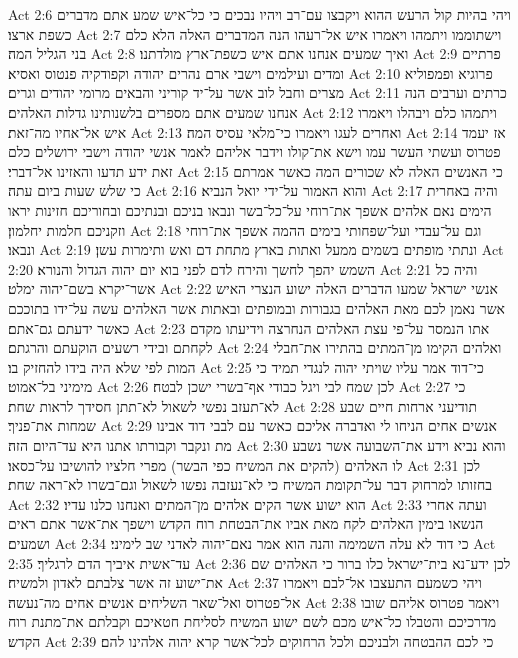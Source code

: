 Act 2:6  ויהי בהיות קול הרעש ההוא ויקבצו עם־רב ויהיו נבכים כי כל־איש שמע אתם מדברים כשפת ארצו׃
Act 2:7  וישתוממו ויתמהו ויאמרו איש אל־רעהו הנה המדברים האלה הלא כלם בני הגליל המה׃
Act 2:8  ואיך שמעים אנחנו אתם איש כשפת־ארץ מולדתנו׃
Act 2:9  פרתיים ומדים ועילמים וישבי ארם נהרים יהודה וקפודקיה פנטוס ואסיא׃
Act 2:10  פרוגיא ופמפוליא מצרים וחבל לוב אשר על־יד קוריני והבאים מרומי יהודים וגרים׃
Act 2:11  כרתים וערבים הנה אנחנו שמעים אתם מספרים בלשנותינו גדלות האלהים׃
Act 2:12  ויתמהו כלם ויבהלו ויאמרו איש אל־אחיו מה־זאת׃
Act 2:13  ואחרים לעגו ויאמרו כי־מלאי עסיס המה׃
Act 2:14  אז יעמד פטרוס ועשתי העשר עמו וישא את־קולו וידבר אליהם לאמר אנשי יהודה וישבי ירושלים כלם זאת ידע תדעו והאזינו אל־דברי׃
Act 2:15  כי האנשים האלה לא שכורים המה כאשר אמרתם כי שלש שעות ביום עתה׃
Act 2:16  והוא האמור על־ידי יואל הנביא׃
Act 2:17  והיה באחרית הימים נאם אלהים אשפך את־רוחי על־כל־בשר ונבאו בניכם ובנתיכם ובחוריכם חזינות יראו וזקניכם חלמות יחלמון׃
Act 2:18  וגם על־עבדי ועל־שפחותי בימים ההמה אשפך את־רוחי ונבאו׃
Act 2:19  ונתתי מופתים בשמים ממעל ואתות בארץ מתחת דם ואש ותימרות עשן׃
Act 2:20  השמש יהפך לחשך והירח לדם לפני בוא יום יהוה הגדול והנורא׃
Act 2:21  והיה כל אשר־יקרא בשם־יהוה ימלט׃
Act 2:22  אנשי ישראל שמעו הדברים האלה ישוע הנצרי האיש אשר נאמן לכם מאת האלהים בגבורות ובמופתים ובאתות אשר האלהים עשה על־ידו בתוככם כאשר ידעתם גם־אתם׃
Act 2:23  אתו הנמסר על־פי עצת האלהים הנחרצה וידיעתו מקדם לקחתם ובידי רשעים הוקעתם והרגתם׃
Act 2:24  ואלהים הקימו מן־המתים בהתירו את־חבלי המות לפי שלא היה בידו להחזיק בו׃
Act 2:25  כי־דוד אמר עליו שויתי יהוה לנגדי תמיד כי מימיני בל־אמוט׃
Act 2:26  לכן שמח לבי ויגל כבודי אף־בשרי ישכן לבטח׃
Act 2:27  כי לא־תעזב נפשי לשאול לא־תתן חסידך לראות שחת׃
Act 2:28  תודיעני ארחות חיים שבע שמחות את־פניך׃
Act 2:29  אנשים אחים הניחו לי ואדברה אליכם כאשר עם לבבי דוד אבינו מת ונקבר וקבורתו אתנו היא עד־היום הזה׃
Act 2:30  והוא נביא וידע את־השבועה אשר נשבע לו האלהים (להקים את המשיח כפי הבשר) מפרי חלציו להושיבו על־כסאו׃
Act 2:31  לכן בחזותו למרחוק דבר על־תקומת המשיח כי לא־נעזבה נפשו לשאול וגם־בשרו לא־ראה שחת׃
Act 2:32  הוא ישוע אשר הקים אלהים מן־המתים ואנחנו כלנו עדיו׃
Act 2:33  ועתה אחרי הנשאו בימין האלהים לקח מאת אביו את־הבטחת רוח הקדש וישפך את־אשר אתם ראים ושמעים׃
Act 2:34  כי דוד לא עלה השמימה והנה הוא אמר נאם־יהוה לאדני שב לימיני׃
Act 2:35  עד־אשית איביך הדם לרגליך׃
Act 2:36  לכן ידע־נא בית־ישראל כלו ברור כי האלהים שם את־ישוע זה אשר צלבתם לאדון ולמשיח׃
Act 2:37  ויהי כשמעם התעצבו אל־לבם ויאמרו אל־פטרוס ואל־שאר השליחים אנשים אחים מה־נעשה׃
Act 2:38  ויאמר פטרוס אליהם שובו מדרכיכם והטבלו כל־איש מכם לשם ישוע המשיח לסליחת חטאיכם וקבלתם את־מתנת רוח הקדש׃
Act 2:39  כי לכם ההבטחה ולבניכם ולכל הרחוקים לכל־אשר קרא יהוה אלהינו להם׃
